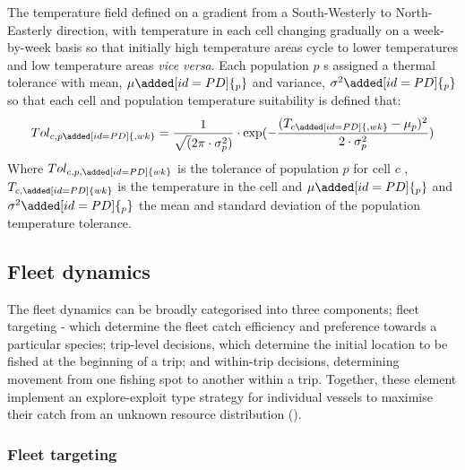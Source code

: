 \documentclass[review]{elsarticle}
\begin{document}
The temperature field  defined on a gradient from a
South-Westerly to North-Easterly direction, with temperature in each cell
changing gradually on a week-by-week basis so that initially high temperature
areas cycle to lower temperatures and low temperature areas
\textit{vice versa}. Each population $p$ s assigned a thermal
tolerance with mean, $\mu\added[id=PD]{_{p}}$ and variance,
$\sigma^2\added[id=PD]{_{p}}$ so that each cell and population temperature
suitability is defined that:
\begin{equation}
	Tol_{c, p\added[id=PD]{, wk}} = \frac{1}{ \sqrt (2\pi \cdot \sigma^2_{p})} \cdot \exp(-
		\frac{(T_{c\added[id=PD]{, wk}} - \mu_{p})^2}{2 \cdot \sigma^2_{p}} )	
\end{equation}
Where $Tol_{c, p, \added[id=PD]{wk}}$ is the tolerance of population $p$ for
cell $c$ , $T_{c, \added[id=PD]{wk}}$ is the
temperature in the cell  and
$\mu\added[id=PD]{_{p}}$ and $\sigma^2\added[id=PD]{_{p}}$ the mean and
standard deviation of the population temperature tolerance. \\


\subsection{Fleet dynamics}

The fleet dynamics can be broadly categorised into three components; fleet
targeting - which determine the fleet catch efficiency
and preference towards a particular species; trip-level decisions, which
determine the initial location to be fished at the beginning of
a trip; and within-trip decisions, determining movement from one fishing spot
to another within a trip. Together, these element implement an explore-exploit
type strategy for individual vessels to maximise their catch from an unknown
resource distribution (\cite{Bailey2018}).

\subsubsection{Fleet targeting}
\end{document}
